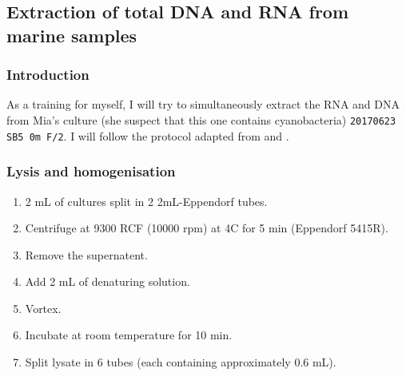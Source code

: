 \subsection{Extraction of total DNA and RNA from marine samples}
\label{task:20180103_cj0}

\subsubsection{Introduction}

As a training for myself, I will try to simultaneously extract the RNA and DNA from Mia's culture (she suspect that this one contains cyanobacteria) \texttt{20170623 SB5 0m F/2}.
I will follow the protocol adapted from \citet{schneider2017extraction} and \citet{chomczynski2006single}.

\subsubsection{Lysis and homogenisation}

\begin{enumerate}
\item 2 mL of cultures split in 2 2mL-Eppendorf tubes.
\item Centrifuge at 9300 RCF (10000 rpm) at 4\degree C for 5 min (Eppendorf 5415R).
\item Remove the supernatent.
\item Add 2 mL of denaturing solution.
\item Vortex.
\item Incubate at room temperature for 10 min.
\item Split lysate in 6 tubes (each containing approximately 0.6 mL).
\end{enumerate}

